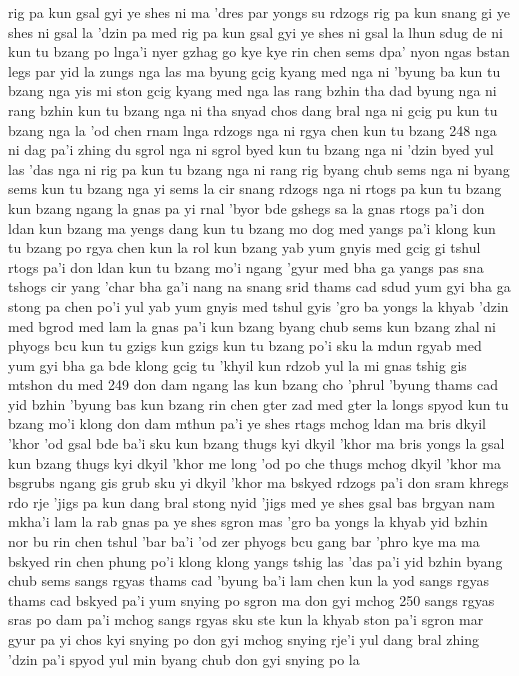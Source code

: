 rig pa kun gsal gyi ye shes ni
ma 'dres par yongs su rdzogs
rig pa kun snang gi ye shes ni
gsal la 'dzin pa med
rig pa kun gsal gyi ye shes ni
gsal la lhun sdug
de ni kun tu bzang po lnga'i nyer gzhag go
kye kye rin chen sems dpa' nyon
ngas bstan legs par yid la zungs
nga las ma byung gcig kyang med
nga ni 'byung ba kun tu bzang
nga yis mi ston gcig kyang med
nga las rang bzhin tha dad byung
nga ni rang bzhin kun tu bzang
nga ni tha snyad chos dang bral
nga ni gcig pu kun tu bzang
nga la 'od chen rnam lnga rdzogs
nga ni rgya chen kun tu bzang
248
nga ni dag pa'i zhing du sgrol
nga ni sgrol byed kun tu bzang
nga ni 'dzin byed yul las 'das
nga ni rig pa kun tu bzang
nga ni rang rig byang chub sems
nga ni byang sems kun tu bzang
nga yi sems la cir snang rdzogs
nga ni rtogs pa kun tu bzang
kun bzang ngang la gnas pa yi
rnal 'byor bde gshegs sa la gnas
rtogs pa'i don ldan kun bzang ma yengs dang
kun tu bzang mo dog med yangs pa'i klong
kun tu bzang po rgya chen kun la rol
kun bzang yab yum gnyis med gcig gi tshul
rtogs pa'i don ldan kun tu bzang mo'i ngang
'gyur med bha ga yangs pas sna tshogs cir yang 'char
bha ga'i nang na snang srid thams cad sdud
yum gyi bha ga stong pa chen po'i yul
yab yum gnyis med tshul gyis 'gro ba yongs la khyab
'dzin med bgrod med lam la gnas pa'i kun bzang byang chub sems
kun bzang zhal ni phyogs bcu kun tu gzigs
kun gzigs kun tu bzang po'i sku la mdun rgyab med
yum gyi bha ga bde klong gcig tu 'khyil
kun rdzob yul la mi gnas tshig gis mtshon du med
249
don dam ngang las kun bzang cho 'phrul 'byung
thams cad yid bzhin 'byung bas kun bzang rin chen gter
zad med gter la longs spyod kun tu bzang mo'i klong
don dam mthun pa'i ye shes rtags mchog ldan
ma bris dkyil 'khor 'od gsal bde ba'i sku
kun bzang thugs kyi dkyil 'khor ma bris yongs la gsal
kun bzang thugs kyi dkyil 'khor me long 'od po che
thugs mchog dkyil 'khor ma bsgrubs ngang gis grub
sku yi dkyil 'khor ma bskyed rdzogs pa'i don
sram khregs rdo rje 'jigs pa kun dang bral
stong nyid 'jigs med ye shes gsal bas brgyan
nam mkha'i lam la rab gnas pa
ye shes sgron mas 'gro ba yongs la khyab
yid bzhin nor bu rin chen tshul
'bar ba'i 'od zer phyogs bcu gang bar 'phro
kye ma ma bskyed rin chen phung po'i klong
klong yangs tshig las 'das pa'i yid bzhin byang chub sems
sangs rgyas thams cad 'byung ba'i lam chen kun la yod
sangs rgyas thams cad bskyed pa'i yum
snying po sgron ma don gyi mchog
250
sangs rgyas sras po dam pa'i mchog
sangs rgyas sku ste kun la khyab
ston pa'i sgron mar gyur pa yi
chos kyi snying po don gyi mchog
snying rje'i yul dang bral zhing 'dzin pa'i spyod yul min
byang chub don gyi snying po la
